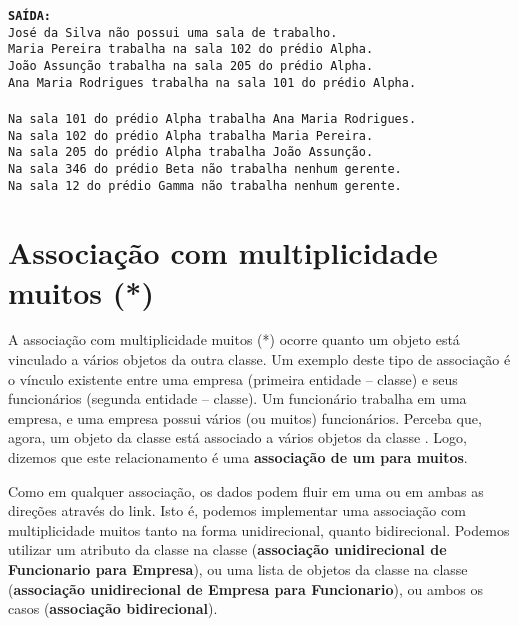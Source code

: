 \begin{minipage}{\textwidth}
	\textbf{\texttt{SAÍDA:}}\\
	\texttt{José da Silva não possui uma sala de trabalho.}\\
	\texttt{Maria Pereira trabalha na sala 102 do prédio Alpha.}\\
	\texttt{João Assunção trabalha na sala 205 do prédio Alpha.}\\
	\texttt{Ana Maria Rodrigues trabalha na sala 101 do prédio Alpha.}\\
	\\
	\texttt{Na sala 101 do prédio Alpha trabalha Ana Maria Rodrigues.}\\
	\texttt{Na sala 102 do prédio Alpha trabalha Maria Pereira.}\\
	\texttt{Na sala 205 do prédio Alpha trabalha João Assunção.}\\
	\texttt{Na sala 346 do prédio Beta não trabalha nenhum gerente.}\\
	\texttt{Na sala 12 do prédio Gamma não trabalha nenhum gerente.}
\end{minipage}

\section{Associação com multiplicidade muitos (*)}
 
A associação com multiplicidade muitos (*) ocorre quanto um objeto está vinculado a vários objetos da outra classe. Um exemplo deste tipo de associação é o vínculo existente entre uma empresa (primeira entidade -- classe) e seus funcionários (segunda entidade -- classe). Um funcionário trabalha em uma empresa, e uma empresa possui vários (ou muitos) funcionários. Perceba que, agora, um objeto da classe  está associado a vários objetos da classe . Logo, dizemos que este relacionamento é uma \textbf{associação de um para muitos}.

Como em qualquer associação, os dados podem fluir em uma ou em ambas as direções através do link. Isto é, podemos implementar uma associação com multiplicidade muitos tanto na forma unidirecional, quanto bidirecional. Podemos utilizar um atributo da classe  na classe  (\textbf{associação unidirecional de Funcionario para Empresa}), ou uma lista de objetos da classe  na classe  (\textbf{associação unidirecional de Empresa para Funcionario}), ou ambos os casos (\textbf{associação bidirecional}). 

